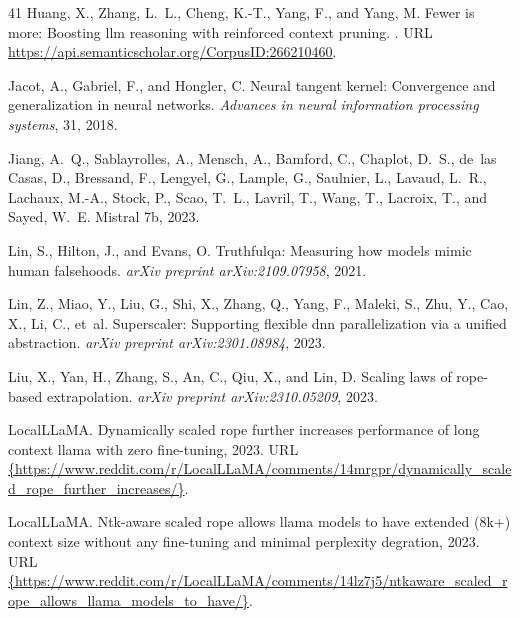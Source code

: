 \documentclass{article}
\theoremstyle{plain}
\theoremstyle{definition}
\theoremstyle{remark}
\begin{document}
\begin{thebibliography}{41}
Huang, X., Zhang, L.~L., Cheng, K.-T., Yang, F., and Yang, M.
\newblock Fewer is more: Boosting llm reasoning with reinforced context
  pruning.
.
\newblock URL \url{https://api.semanticscholar.org/CorpusID:266210460}.

Jacot, A., Gabriel, F., and Hongler, C.
\newblock Neural tangent kernel: Convergence and generalization in neural
  networks.
\newblock \emph{Advances in neural information processing systems}, 31, 2018.

Jiang, A.~Q., Sablayrolles, A., Mensch, A., Bamford, C., Chaplot, D.~S., de~las
  Casas, D., Bressand, F., Lengyel, G., Lample, G., Saulnier, L., Lavaud,
  L.~R., Lachaux, M.-A., Stock, P., Scao, T.~L., Lavril, T., Wang, T., Lacroix,
  T., and Sayed, W.~E.
\newblock Mistral 7b, 2023.

Lin, S., Hilton, J., and Evans, O.
\newblock Truthfulqa: Measuring how models mimic human falsehoods.
\newblock \emph{arXiv preprint arXiv:2109.07958}, 2021.

Lin, Z., Miao, Y., Liu, G., Shi, X., Zhang, Q., Yang, F., Maleki, S., Zhu, Y.,
  Cao, X., Li, C., et~al.
\newblock Superscaler: Supporting flexible dnn parallelization via a unified
  abstraction.
\newblock \emph{arXiv preprint arXiv:2301.08984}, 2023.

Liu, X., Yan, H., Zhang, S., An, C., Qiu, X., and Lin, D.
\newblock Scaling laws of rope-based extrapolation.
\newblock \emph{arXiv preprint arXiv:2310.05209}, 2023.

LocalLLaMA.
\newblock Dynamically scaled rope further increases performance of long context
  llama with zero fine-tuning, 2023{}.
\newblock URL
  \url{{https://www.reddit.com/r/LocalLLaMA/comments/14mrgpr/dynamically_scaled_rope_further_increases/}}.

LocalLLaMA.
\newblock Ntk-aware scaled rope allows llama models to have extended (8k+)
  context size without any fine-tuning and minimal perplexity degration,
  2023{}.
\newblock URL
  \url{{https://www.reddit.com/r/LocalLLaMA/comments/14lz7j5/ntkaware_scaled_rope_allows_llama_models_to_have/}}.


\end{thebibliography}
\end{document}
